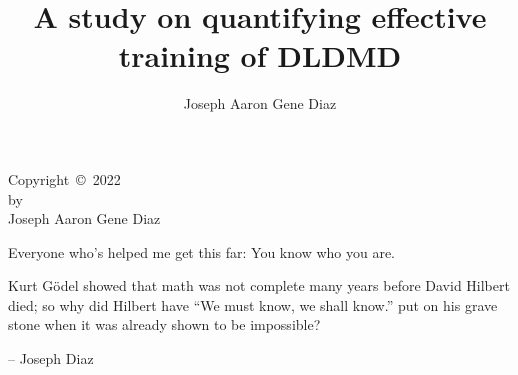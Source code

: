 \documentclass{sdsu-thesis}
\author{Joseph Aaron Gene Diaz}
\title{A study on quantifying effective training of DLDMD}
\theoremstyle{dtm}
\begin{document}
\maketitle

\makesignature

\begin{copyrightpage}
  Copyright~\copyright~2022 \\
  by \\
  Joseph Aaron Gene Diaz
\end{copyrightpage}


% 
\begin{dedication}
  \vspace{3in}
  \centering
  Everyone who's helped me get this far: You know who you are.
\end{dedication}


% 
\begin{epigraph}
  Kurt G\"{o}del showed that math was not complete many years before David 
  Hilbert died; so why did Hilbert have ``We must know, we shall know.'' put 
  on his grave stone when it was already shown to be impossible?\\
  \begin{flushright}
    -- Joseph Diaz
  \end{flushright}
\end{epigraph}


\begin{abstract}
  
\end{abstract}


\tableofcontents
\end{document}
